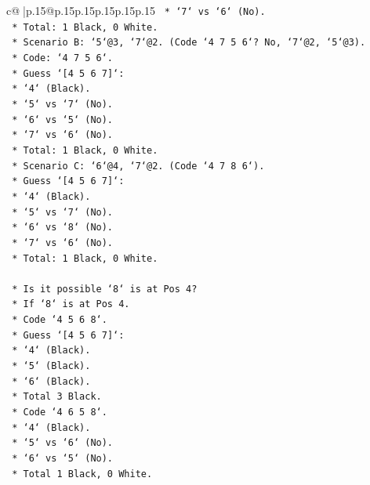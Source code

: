 \documentclass{article}
\begin{document}
{\begin{supertabular}{c@{$\;$}|p{.15\linewidth}@{}p{.15\linewidth}p{.15\linewidth}p{.15\linewidth}p{.15\linewidth}p{.15\linewidth}}
{{{\texttt{            *   `7` vs `6` (No).} \\
\texttt{            *   Total: 1 Black, 0 White.} \\
\texttt{    *   Scenario B: `5`@3, `7`@2. (Code `4 7 5 6`? No, `7`@2, `5`@3).} \\
\texttt{        *   Code: `4 7 5 6`.} \\
\texttt{        *   Guess `{[}4 5 6 7{]}`:} \\
\texttt{            *   `4` (Black).} \\
\texttt{            *   `5` vs `7` (No).} \\
\texttt{            *   `6` vs `5` (No).} \\
\texttt{            *   `7` vs `6` (No).} \\
\texttt{            *   Total: 1 Black, 0 White.} \\
\texttt{    *   Scenario C: `6`@4, `7`@2. (Code `4 7 8 6`).} \\
\texttt{        *   Guess `{[}4 5 6 7{]}`:} \\
\texttt{            *   `4` (Black).} \\
\texttt{            *   `5` vs `7` (No).} \\
\texttt{            *   `6` vs `8` (No).} \\
\texttt{            *   `7` vs `6` (No).} \\
\texttt{            *   Total: 1 Black, 0 White.} \\
\\ 
\texttt{    *   Is it possible `8` is at Pos 4?} \\
\texttt{        *   If `8` is at Pos 4.} \\
\texttt{        *   Code `4 5 6 8`.} \\
\texttt{        *   Guess `{[}4 5 6 7{]}`:} \\
\texttt{            *   `4` (Black).} \\
\texttt{            *   `5` (Black).} \\
\texttt{            *   `6` (Black).} \\
\texttt{            *   Total 3 Black.} \\
\texttt{        *   Code `4 6 5 8`.} \\
\texttt{            *   `4` (Black).} \\
\texttt{            *   `5` vs `6` (No).} \\
\texttt{            *   `6` vs `5` (No).} \\
\texttt{            *   Total 1 Black, 0 White.} \\
}}}
\end{supertabular}}
\end{document}
